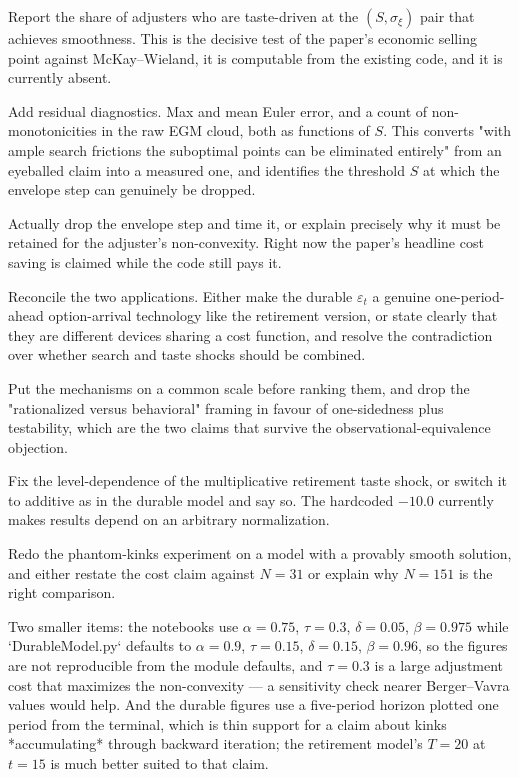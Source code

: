 Report the share of adjusters who are taste-driven at the $(S,\sigma_\xi)$ pair that achieves smoothness. This is the decisive test of the paper's economic selling point against McKay–Wieland, it is computable from the existing code, and it is currently absent.

Add residual diagnostics. Max and mean Euler error, and a count of non-monotonicities in the raw EGM cloud, both as functions of $S$. This converts "with ample search frictions the suboptimal points can be eliminated entirely" from an eyeballed claim into a measured one, and identifies the threshold $S$ at which the envelope step can genuinely be dropped.

Actually drop the envelope step and time it, or explain precisely why it must be retained for the adjuster's non-convexity. Right now the paper's headline cost saving is claimed while the code still pays it.

Reconcile the two applications. Either make the durable $\varepsilon_t$ a genuine one-period-ahead option-arrival technology like the retirement version, or state clearly that they are different devices sharing a cost function, and resolve the contradiction over whether search and taste shocks should be combined.

Put the mechanisms on a common scale before ranking them, and drop the "rationalized versus behavioral" framing in favour of one-sidedness plus testability, which are the two claims that survive the observational-equivalence objection.

Fix the level-dependence of the multiplicative retirement taste shock, or switch it to additive as in the durable model and say so. The hardcoded $-10.0$ currently makes results depend on an arbitrary normalization.

Redo the phantom-kinks experiment on a model with a provably smooth solution, and either restate the cost claim against $N=31$ or explain why $N=151$ is the right comparison.

Two smaller items: the notebooks use $\alpha=0.75$, $\tau=0.3$, $\delta=0.05$, $\beta=0.975$ while `DurableModel.py` defaults to $\alpha=0.9$, $\tau=0.15$, $\delta=0.15$, $\beta=0.96$, so the figures are not reproducible from the module defaults, and $\tau=0.3$ is a large adjustment cost that maximizes the non-convexity — a sensitivity check nearer Berger–Vavra values would help. And the durable figures use a five-period horizon plotted one period from the terminal, which is thin support for a claim about kinks *accumulating* through backward iteration; the retirement model's $T=20$ at $t=15$ is much better suited to that claim.